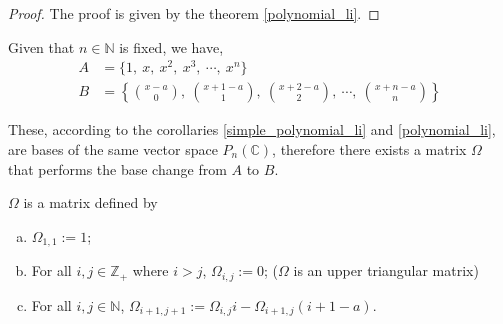 \documentclass[12pt]{article}
\begin{document}
\begin{proof}
    The proof is given by the theorem \ref{polynomial_li}.
\end{proof}

\vspace{20px}

Given that $n \in \mathbb{N}$ is fixed, we have,
\begin{align*}
    A & = \{ 1,\ x,\ x^2,\ x^3,\ \cdots,\ x^n \}                                                             \\
    B & = \left\{ \binom{x-a}{0},\ \binom{x+1-a}{1},\ \binom{x+2-a}{2},\ \cdots ,\ \binom{x+n-a}{n} \right\}
\end{align*}

These, according to the corollaries \ref{simple_polynomial_li} and \ref{polynomial_li}, are bases of the same vector space $P_n(\mathbb{C})$, therefore there exists a matrix $\Omega$ that performs the base change from $A$ to $B$.

\vspace{20px}

\begin{theorem}

    $\Omega$ is a matrix defined by

    \begin{enumerate}[(a)]
        \item $\Omega_{1, 1} := 1$;
        \item For all $i, j \in \mathbb{Z_+}$ where  $i > j$, $\Omega_{i, j} := 0$; \hfill ($\Omega$ is an upper triangular matrix)
        \item For all $i, j \in \mathbb{N}$, $\Omega_{i+1, j+1} :=  \Omega_{i, j} i - \Omega_{i+1, j} (i+1-a)$.
    \end{enumerate}

\end{theorem}
\end{document}
